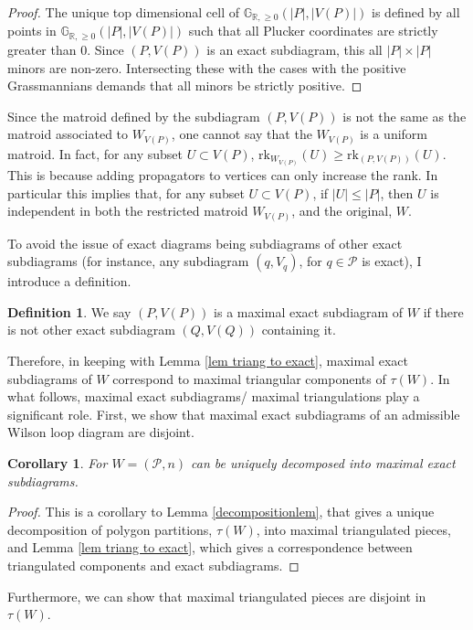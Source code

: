 \documentclass[11pt]{article}
\newcommand{\note}{\todo[color=green!40]}
\newcommand{\R}{\mathbb{R}}
\newcommand{\Gr}{\mathbb{G}_{\R, \geq 0}}
\newcommand{\rk}{\textrm{rk}}
\newcommand{\cP}{\mathcal{P}}
\newtheorem{cor}[thm]{Corollary}
\theoremstyle{remark}
\theoremstyle{definition}
\newtheorem{dfn}[thm]{Definition}
\begin{document}
\begin{proof}
The unique top dimensional cell of $\Gr(|P|, |V(P)|)$ is defined by all points in $\Gr(|P|, |V(P)|)$ such that all Plucker coordinates are strictly greater than $0$. Since $(P, V(P))$ is an exact subdiagram, this all $|P| \times |P|$ minors are non-zero. Intersecting these with the cases with the positive Grassmannians demands that all minors be strictly positive.
\end{proof}

Since the matroid defined by the subdiagram $(P , V(P))$ is not the same as the matroid associated to $W_{V(P)}$, one cannot say that the $W_{V(P)}$ is a uniform matroid. In fact, for any subset $U \subset V(P)$, $\rk_{W_{V(P)}}(U) \geq \rk_{(P , V(P))}(U)$. This is because adding propagators to vertices can only increase the rank. In particular this implies that, for any subset $U \subset V(P)$, if $|U| \leq |P|$, then $U$ is independent in both the restricted matroid $W_{V(P)}$, and the original, $W$.

To avoid the issue of exact diagrams being subdiagrams of other exact subdiagrams (for instance, any subdiagram $(q, V_q)$, for $q \in \cP$ is exact), I introduce a definition.

\begin{dfn}
We say $(P, V(P))$ is a maximal exact subdiagram of $W$ if there is not other exact subdiagram $(Q, V(Q))$ containing it.
\end{dfn}

Therefore, in keeping with Lemma \ref{lem triang to exact}, maximal exact subdiagrams of $W$ correspond to maximal triangular components of $\tau(W)$. In what follows, maximal exact subdiagrams/ maximal triangulations play a significant role. First, we show that maximal exact subdiagrams of an admissible Wilson loop diagram are disjoint.

\begin{cor}
For $W = (\cP, n)$ can be uniquely decomposed into maximal exact subdiagrams.
\end{cor}

\begin{proof}
This is a corollary to Lemma \ref{decompositionlem}, that gives a unique decomposition of polygon partitions, $\tau(W)$,  into maximal triangulated pieces, and Lemma \ref{lem triang to exact}, which gives a correspondence between triangulated components and exact subdiagrams.
\end{proof}

Furthermore, we can show that maximal triangulated pieces are disjoint in $\tau(W)$. \note{do we have this already?}
\end{document}

